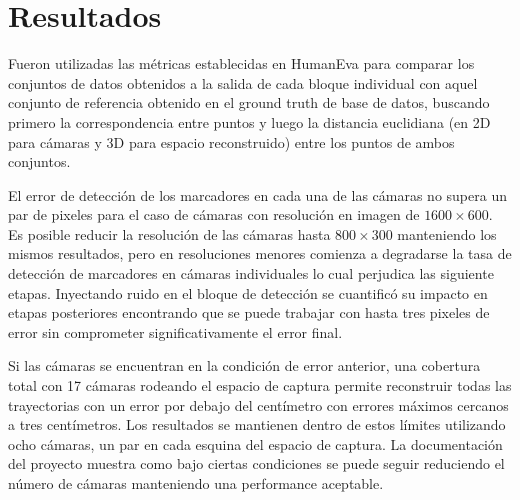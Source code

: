 \section{Resultados}

Fueron utilizadas las métricas establecidas en HumanEva \cite{humaneva} para comparar los conjuntos de datos obtenidos a la salida de cada bloque individual con aquel conjunto de referencia obtenido en el ground truth de base de datos, buscando primero la correspondencia entre puntos y luego la distancia euclidiana (en 2D para cámaras y 3D para espacio reconstruido) entre los puntos de ambos conjuntos.



El error de detección de los marcadores en cada una de las cámaras no supera un par de pixeles para el caso de cámaras con resolución en imagen de $1600\times600$. Es posible reducir la resolución de las cámaras hasta $800\times300$ manteniendo los mismos resultados, pero en resoluciones menores comienza a degradarse la tasa de detección de marcadores en cámaras individuales lo cual perjudica las siguiente etapas. Inyectando ruido en el bloque de detección se cuantificó su impacto en etapas posteriores encontrando que se puede trabajar con hasta tres pixeles de error sin comprometer significativamente el error final.


Si las cámaras se encuentran en la condición de error anterior, una cobertura total con 17 cámaras rodeando el espacio de captura permite reconstruir todas las trayectorias con un error por debajo del centímetro con errores máximos cercanos a tres centímetros. Los resultados se mantienen dentro de estos límites utilizando ocho cámaras, un par en cada esquina del espacio de captura.
La documentación del proyecto \cite{proyecto_biomecanica} muestra como bajo ciertas condiciones se puede seguir reduciendo el número de cámaras manteniendo una performance aceptable.
 



